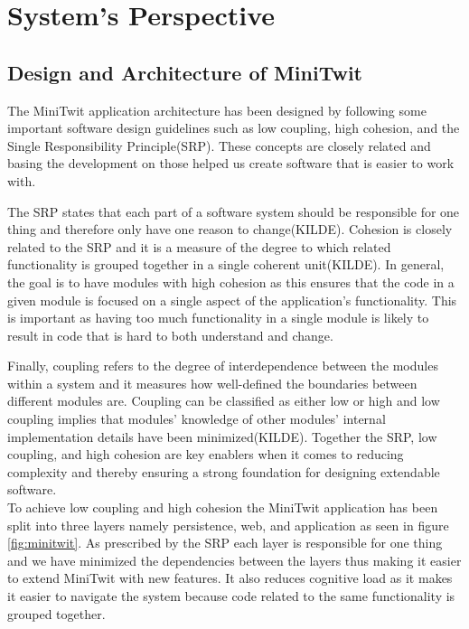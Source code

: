 \section{System's Perspective}

\subsection{Design and Architecture of MiniTwit}
The MiniTwit application architecture has been designed by following some important software design guidelines 
such as low coupling, high cohesion, and the Single Responsibility Principle(SRP). 
These concepts are closely related and basing the development on those helped us create software that is easier to work with. 

The SRP states that each part of a software system should be responsible for one thing and therefore only have one reason to change(KILDE). 
Cohesion is closely related to the SRP and it is a measure of the degree to which related functionality is grouped together in a single coherent unit(KILDE). 
In general, the goal is to have modules with high cohesion as this ensures that the code in a given module is focused on a single aspect of the application's functionality. 
This is important as having too much functionality in a single module is likely to result in code that is hard to both understand and change. 

Finally, coupling refers to the degree of interdependence between the modules within a system and it measures how well-defined the boundaries between different modules are. 
Coupling can be classified as either low or high and low coupling implies that modules' knowledge of other modules' internal implementation details have been minimized(KILDE).
Together the SRP, low coupling, and high cohesion are key enablers when it comes to reducing complexity and thereby ensuring a strong foundation for designing extendable software. \\

To achieve low coupling and high cohesion the MiniTwit application has been split into three layers namely persistence, web, and application as seen in figure \ref{fig:minitwit}. 
As prescribed by the SRP each layer is responsible for one thing and we have minimized the dependencies between the layers thus making it easier to extend MiniTwit with new features. 
It also reduces cognitive load as it makes it easier to navigate the system because code related to the same functionality is grouped together. 


